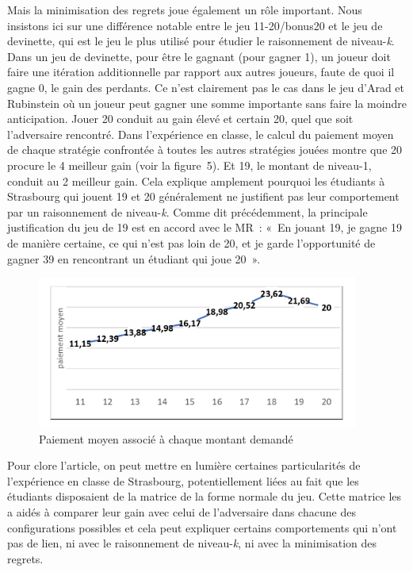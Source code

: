 \begin{Article}
\begin{refsection}[UmbhauerFR]
Mais la minimisation des regrets joue également un rôle important. Nous
insistons ici sur une différence notable entre le jeu 11-20/bonus20
et le jeu de devinette, qui est le jeu le plus utilisé pour étudier le
raisonnement de niveau-\emph{k}. Dans un jeu de devinette, pour être le
gagnant (pour gagner 1), un joueur doit faire une itération
additionnelle par rapport aux autres joueurs, faute de quoi il gagne 0,
le gain des perdants. Ce n'est clairement pas le cas dans le jeu
d'Arad et Rubinstein où un joueur peut gagner une somme importante sans
faire la moindre anticipation. Jouer 20 conduit au gain élevé et certain
20, quel que soit l'adversaire rencontré. Dans l'expérience en classe,
le calcul du paiement moyen de chaque stratégie confrontée à toutes les
autres stratégies jouées montre que 20 procure le 4\ieme
meilleur gain (voir la figure~5). Et 19, le montant de niveau-1, conduit
au 2\ieme{} meilleur gain. Cela explique amplement
pourquoi les étudiants à Strasbourg qui jouent 19 et 20 généralement ne
justifient pas leur comportement par un raisonnement de niveau-\emph{k}.
Comme dit précédemment, la principale justification du jeu de 19 est en
accord avec le MR~: «~En jouant 19, je gagne 19 de manière certaine, ce
qui n'est pas loin de 20, et je garde l'opportunité de gagner 39 en
rencontrant un étudiant qui joue 20~».

\begin{figure}[h]
    \centering
    \caption{Paiement moyen associé à chaque montant demandé}
    \includegraphics[height=5cm]{Articles-bons-a-composer/02_Umbhauer/02_Umbhauer_fr_Figures/02_Umbhauer_fr_figure-5.jpeg}
\end{figure}

Pour clore l'article, on peut mettre en lumière certaines particularités
de l'expérience en classe de Strasbourg, potentiellement liées au fait
que les étudiants disposaient de la matrice de la forme normale du jeu.
Cette matrice les a aidés à comparer leur gain avec celui de
l'adversaire dans chacune des configurations possibles et cela peut
expliquer certains comportements qui n'ont pas de lien, ni avec le
raisonnement de niveau-\emph{k}, ni avec la minimisation des regrets.


\end{refsection}
\end{Article}
